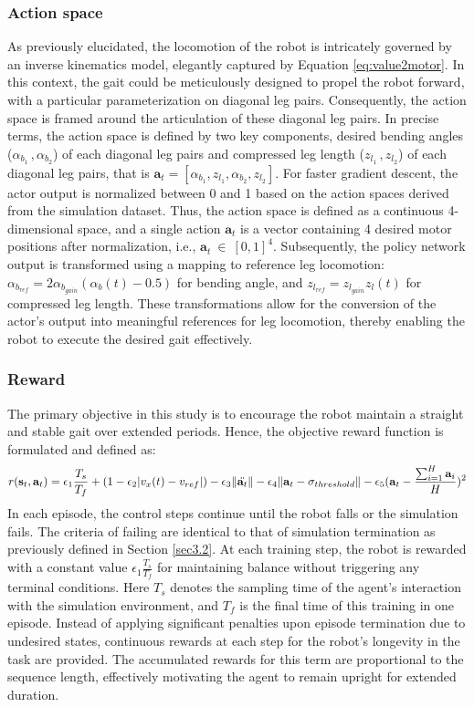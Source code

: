 \subsubsection{Action space}
\label{Sec:as}
As previously elucidated, the locomotion of the robot is intricately governed by an inverse kinematics model, elegantly captured by Equation \ref{eq:value2motor}. In this context, the gait could be meticulously designed to propel the robot forward, with a particular parameterization on diagonal leg pairs. Consequently, the action space is framed around the articulation of these diagonal leg pairs. In precise terms, the action space is defined by two key components, desired bending angles ($\alpha_{b_1}\,,\alpha_{b_2}$) of each diagonal leg pairs and compressed leg length ($z_{l_1}\,,z_{l_2}$) of each diagonal leg pairs, that is $\mathbf{a}_{t} = [\alpha_{b_1}, z_{l_1}, \alpha_{b_2}, z_{l_2}]$. For faster gradient descent, the actor output is normalized between 0 and 1 based on the action spaces derived from the simulation dataset. Thus, the action space is defined as a continuous 4-dimensional space, and a single action $\mathbf{a}_t$ is a vector containing 4 desired motor positions after normalization, i.e., $\mathbf{a}_t \:\in\:[0,1]^4$. Subsequently, the policy network output is transformed using a mapping to reference leg locomotion: $\alpha_{b_{ref}} = 2\alpha_{b_{gain}}(\alpha_b(t) -0.5)$ for bending angle, and $z_{l_{ref}} = z_{l_{gain}}z_l(t)$ for compressed leg length. These transformations allow for the conversion of the actor's output into meaningful references for leg locomotion, thereby enabling the robot to execute the desired gait effectively.
\subsubsection{Reward}
The primary objective in this study is to encourage the robot maintain a straight and stable gait over extended periods. Hence, the objective reward function is formulated and defined as: 
\begin{equation}
    r(\mathbf{s}_t,\mathbf{a}_t) = \epsilon_1\frac{T_s}{T_f} + (1-\epsilon_2|v_x(t)-v_{ref}|)-\epsilon_3\lVert\Ddot{\mathbf{a}_t}\rVert - \epsilon_4\lVert\mathbf{a}_t-\mathbf{\sigma}_{threshold}\rVert - \epsilon_5(\mathbf{a}_t-\frac{\sum_{i=1}^{H}\mathbf{a}_i}{H})^2
    \label{eq:reward}
\end{equation}
In each episode, the control steps continue until the robot falls or the simulation fails. The criteria of failing are identical to that of simulation termination as previously defined in Section \ref{sec3.2}. At each training step, the robot is rewarded with a constant value $\epsilon_1\frac{T_s}{T_f}$ for maintaining balance without triggering any terminal conditions. Here $T_s$ denotes the sampling time of the agent's interaction with the simulation environment, and $T_f$ is the final time of this training in one episode. Instead of applying significant penalties upon episode termination due to undesired states, continuous rewards at each step for the robot's longevity in the task are provided. The accumulated rewards for this term are proportional to the sequence length, effectively motivating the agent to remain upright for extended duration. 

